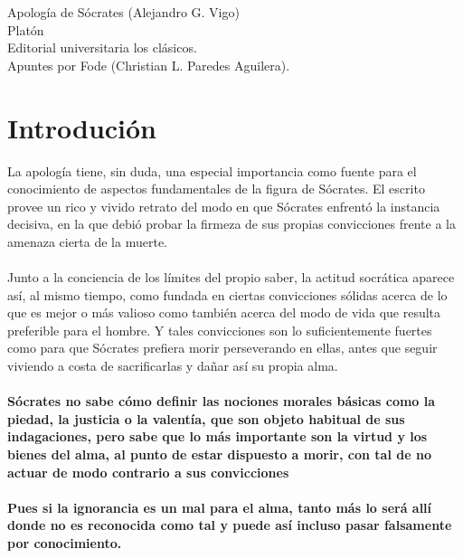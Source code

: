\begin{center}
    \huge Apología de Sócrates (Alejandro G. Vigo)\\
    \vspace*{0.5cm}
    \large Platón\\
    Editorial universitaria los clásicos.\\
    \vspace{1cm}
    \Large Apuntes por Fode (Christian L. Paredes Aguilera).
    \vspace{1.5cm}
\end{center}

\section*{\center Introdución}

\begin{multicols}{2}

La apología tiene, sin duda, una especial importancia como fuente para el conocimiento de aspectos fundamentales de la figura de Sócrates. El escrito provee un rico y vivido retrato del modo en que Sócrates enfrentó la instancia decisiva, en la que debió probar la firmeza de sus propias convicciones frente a la amenaza cierta de la muerte. \\\\
Junto a la conciencia de los límites del propio saber, la actitud socrática aparece así, al mismo tiempo, como fundada en ciertas convicciones sólidas acerca de lo que es mejor o más valioso como también acerca del modo de vida que resulta preferible para el hombre. Y tales convicciones son lo suficientemente fuertes como para que Sócrates prefiera morir perseverando en ellas, antes que seguir viviendo a costa de sacrificarlas y dañar así su propia alma.\\\\
\textbf{Sócrates no sabe cómo definir las nociones morales básicas como la piedad, la justicia o la valentía, que son objeto habitual de sus indagaciones, pero sabe que lo más importante son la virtud y los bienes del alma, al punto de estar dispuesto a morir, con tal de no actuar de modo contrario a sus convicciones}\\\\

\textbf{Pues si la ignorancia es un mal para el alma, tanto más lo será allí donde no es reconocida como tal y puede así incluso pasar falsamente por conocimiento.}

\end{multicols}

